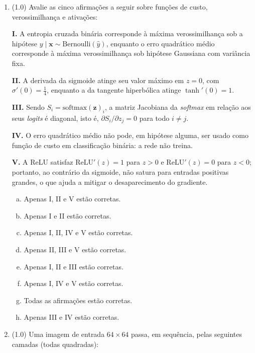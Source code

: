 \documentclass[11pt,a4paper]{article}
\begin{document}
\begin{enumerate}[1)]
\item (1.0) Avalie as cinco afirmações a seguir sobre funções de custo, verossimilhança e ativações:

\textbf{I.} A entropia cruzada binária corresponde à máxima verossimilhança sob a hipótese $y \mid \mathbf{x} \sim \mathrm{Bernoulli}(\hat{y})$, enquanto o erro quadrático médio corresponde à máxima verossimilhança sob hipótese Gaussiana com variância fixa.

\textbf{II.} A derivada da sigmoide atinge seu valor máximo em $z = 0$, com $\sigma'(0) = \tfrac{1}{4}$, enquanto a da tangente hiperbólica atinge $\tanh'(0) = 1$.

\textbf{III.} Sendo $S_i = \mathrm{softmax}(\mathbf{z})_i$, a matriz Jacobiana da \textit{softmax} em relação aos seus \textit{logits} é diagonal, isto é, $\partial S_i / \partial z_j = 0$ para todo $i \neq j$.

\textbf{IV.} O erro quadrático médio não pode, em hipótese alguma, ser usado como função de custo em classificação binária: a rede não treina.

\textbf{V.} A ReLU satisfaz $\mathrm{ReLU}'(z) = 1$ para $z > 0$ e $\mathrm{ReLU}'(z) = 0$ para $z < 0$; portanto, ao contrário da sigmoide, não satura para entradas positivas grandes, o que ajuda a mitigar o desaparecimento do gradiente.

\begin{enumerate}[a)]
    \item Apenas I, II e V estão corretas.
    \item Apenas I e II estão corretas.
    \item Apenas I, II, IV e V estão corretas.
    \item Apenas II, III e V estão corretas.
    \item Apenas I, II e III estão corretas.
    \item Apenas I, IV e V estão corretas.
    \item Todas as afirmações estão corretas.
    \item Apenas III e IV estão corretas.
\end{enumerate}


\item (1.0) Uma imagem de entrada $64 \times 64$ passa, em sequência, pelas seguintes camadas (todas quadradas):


\end{enumerate}
\end{document}
